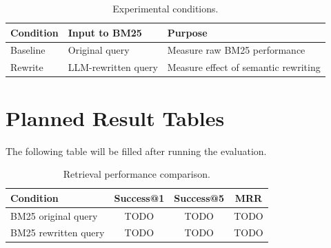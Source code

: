 \begin{table}[h]
\centering
\begin{tabular}{lll}
\toprule
\textbf{Condition} & \textbf{Input to BM25} & \textbf{Purpose} \\
\midrule
Baseline & Original query & Measure raw BM25 performance \\
Rewrite & LLM-rewritten query & Measure effect of semantic rewriting \\
\bottomrule
\end{tabular}
\caption{Experimental conditions.}
\label{tab:experimental-conditions}
\end{table}

\section{Planned Result Tables}
The following table will be filled after running the evaluation.

\begin{table}[h]
\centering
\begin{tabular}{lccc}
\toprule
\textbf{Condition} & \textbf{Success@1} & \textbf{Success@5} & \textbf{MRR} \\
\midrule
BM25 original query & TODO & TODO & TODO \\
BM25 rewritten query & TODO & TODO & TODO \\
\bottomrule
\end{tabular}
\caption{Retrieval performance comparison.}
\label{tab:results-main}
\end{table}
\par
